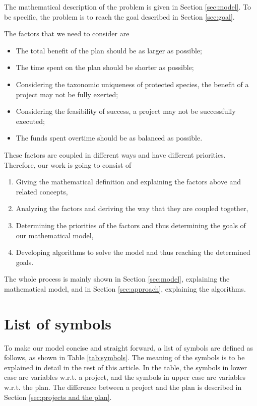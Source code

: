 \documentclass{article}
\begin{document}
The mathematical description of the problem is given in Section \ref{sec:model}.
To be specific, the problem is to reach the goal described in Section \ref{sec:goal}.

The factors that we need to consider are
\begin{itemize}
\item The total benefit of the plan should be as larger as possible;
\item The time spent on the plan should be shorter as possible;
\item Considering the taxonomic uniqueness of protected species, the benefit of a project may not be fully exerted;
\item Considering the feasibility of success, a project may not be successfully executed;
\item The funds spent overtime should be as balanced as possible.
\end{itemize}

These factors are coupled in different ways and have different priorities.
Therefore, our work is going to consist of
\begin{enumerate}
\item Giving the mathematical definition and explaining the factors above and related concepts,
\item Analyzing the factors and deriving the way that they are coupled together,
\item Determining the priorities of the factors and thus determining the goals of our mathematical model,
\item Developing algorithms to solve the model and thus reaching the determined goals.
\end{enumerate}

The whole process is mainly shown in Section \ref{sec:model}, explaining the mathematical model, and in Section \ref{sec:approach}, explaining the algorithms.

\section{List of symbols}

To make our model concise and straight forward, a list of symbols are defined as follows, as shown in Table \ref{tab:symbols}.
The meaning of the symbols is to be explained in detail in the rest of this article.
In the table, the symbols in lower case are variables w.r.t. a project,
and the symbols in upper case are variables w.r.t. the plan.
The difference between a project and the plan is described in Section \ref{sec:projects and the plan}.
\end{document}
